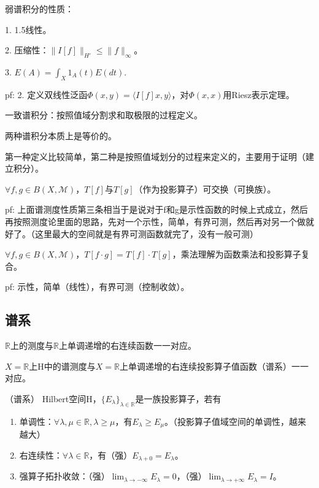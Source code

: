 弱谱积分的性质：

1. 1.5线性。

2. 压缩性：$\|I[f]\|_{H'} \le \|f\|_{\infty}$。

3. $E(A) = \int_X 1_A(t) E(dt)$.

pf: 2. 定义双线性泛函$\Phi(x, y) = \langle I[f]x, y \rangle$，对$\Phi(x, x)$用Riesz表示定理。

一致谱积分：按照值域分割求和取极限的过程定义。

两种谱积分本质上是等价的。

第一种定义比较简单，第二种是按照值域划分的过程来定义的，主要用于证明（建立积分）。

$\forall f, g \in B(X, \mathcal{M})$，$T[f]$与$T[g]$（作为投影算子）可交换（可换族）。

pf: 上面谱测度性质第三条相当于是说对于f和g是示性函数的时候上式成立，然后再按照测度论里面的思路，先对一个示性，简单，有界可测，然后再对另一个做就好了。（这里最大的空间就是有界可测函数就完了，没有一般可测）

$\forall f, g \in B(X, \mathcal{M})$，$T[f \cdot g] = T[f] \cdot T[g]$，乘法理解为函数乘法和投影算子复合。

pf: 示性，简单（线性），有界可测（控制收敛）。

\subsection{谱系}

$\mathbb{R}$上的测度与$\mathbb{R}$上单调递增的右连续函数一一对应。

$X = \mathbb{R}$上H中的谱测度与$X = \mathbb{R}$上单调递增的右连续投影算子值函数（谱系）一一对应。

\begin{df}（谱系）
  Hilbert空间H，$\{E_\lambda\}_{\lambda \in \mathbb{R}}$是一族投影算子，若有
  \begin{enumerate}
    \item 单调性：$\forall \lambda, \mu \in \mathbb{R}, \lambda \ge \mu$，有$E_{\lambda} \ge E_{\mu}$。（投影算子值域空间的单调性，越来越大）
    \item 右连续性：$\forall \lambda \in \mathbb{R}$，有（强）$E_{\lambda + 0} = E_\lambda$。
    \item 强算子拓扑收敛：（强）$\lim_{\lambda \to -\infty} E_{\lambda}=0$，（强）$\lim_{\lambda \rightarrow+\infty} E_{\lambda}=I$。
  \end{enumerate}
\end{df}

